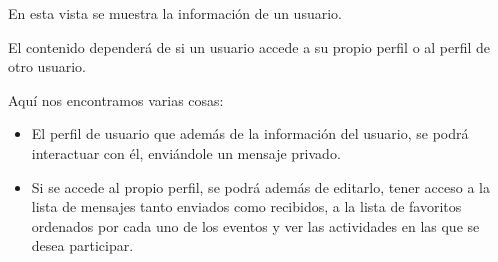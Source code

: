 En esta vista se muestra la información de un usuario.


El contenido dependerá de si un usuario accede a su propio perfil o al perfil de otro usuario.


Aquí nos encontramos varias cosas:

\begin{itemize}
\item El perfil de usuario que además de la información del usuario, se podrá interactuar con él, enviándole un mensaje privado.
\item Si se accede al propio perfil, se podrá además de editarlo, tener acceso a la lista de mensajes tanto enviados como recibidos, a la lista de favoritos ordenados por cada uno de los eventos y ver las actividades en las que se desea participar.
\end{itemize}

